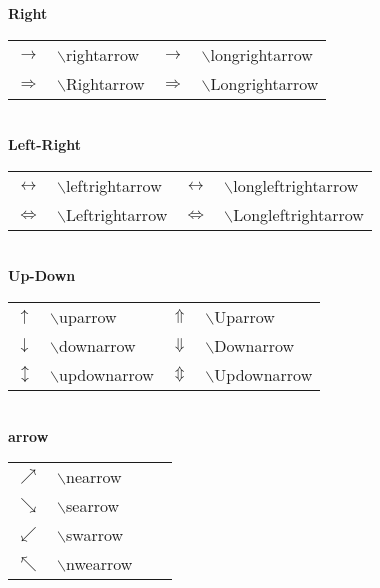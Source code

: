 \documentclass[12pt,a4paper]{report}
\begin{document}
			\textbf{Right}\\
			\begin{tabular}{ p{} p{} 
							p{} p{}  }
			\toprule
			$\rightarrow $		&$\backslash$rightarrow& 
			$\longrightarrow$	&$\backslash$longrightarrow \\
			$\Rightarrow$		&$\backslash$Rightarrow&
			$\Longrightarrow$	&$\backslash$Longrightarrow \\
			\bottomrule
			\end{tabular} \\
		
			\textbf{Left-Right}\\
			\begin{tabular}{ p{} p{} 
							p{} p{}  }
			\toprule
			$\leftrightarrow $		&$\backslash$leftrightarrow& 
			$\longleftrightarrow$	&$\backslash$longleftrightarrow \\
			$\Leftrightarrow$		&$\backslash$Leftrightarrow&
			$\Longleftrightarrow$	&$\backslash$Longleftrightarrow \\
			\bottomrule
			\end{tabular} \\

			\textbf{Up-Down}\\
			\begin{tabular}{ p{} p{} 
							p{} p{}  }
			\toprule
			$\uparrow $			&$\backslash$uparrow& 
			$\Uparrow$				&$\backslash$Uparrow \\
			$\downarrow$			&$\backslash$downarrow&
			$\Downarrow$			&$\backslash$Downarrow\\
			$\updownarrow$		&$\backslash$updownarrow&
			$\Updownarrow$		&$\backslash$Updownarrow\\
			\bottomrule
			\end{tabular} \\

			\textbf{arrow}\\
			\begin{tabular}{ p{} p{} 
							p{} p{}  }
			\toprule
			$\nearrow $				&$\backslash$nearrow \\
			$\searrow $				&$\backslash$searrow \\ 
			$\swarrow $			&$\backslash$swarrow \\ 
			$\nwarrow $			&$\backslash$nwearrow \\ 
			\bottomrule
			\end{tabular} \\
\end{document}
